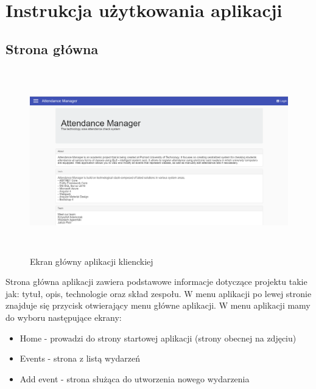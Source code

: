 \newpage\section{Instrukcja użytkowania aplikacji \NazwaSys} \label{sec:instrukcja}

\subsection{Strona główna}
\begin{figure}[h!]
\centering
\includegraphics[height=8cm,width=15cm]{images/MainScreen}
\caption{Ekran główny aplikacji klienckiej}
\label{fig:MainScreen}
\end{figure}

Strona główna aplikacji zawiera podstawowe informacje dotyczące projektu takie jak: tytuł, opis, technologie oraz skład zespołu. W menu aplikacji po lewej stronie znajduje się przycisk otwierający menu główne aplikacji. W menu aplikacji mamy do wyboru następujące ekrany:
\begin{itemize}
    \item Home - prowadzi do strony startowej aplikacji (strony obecnej na zdjęciu)
    \item Events - strona z listą wydarzeń
    \item Add event - strona służąca do utworzenia nowego wydarzenia
\end{itemize}
\newpage
